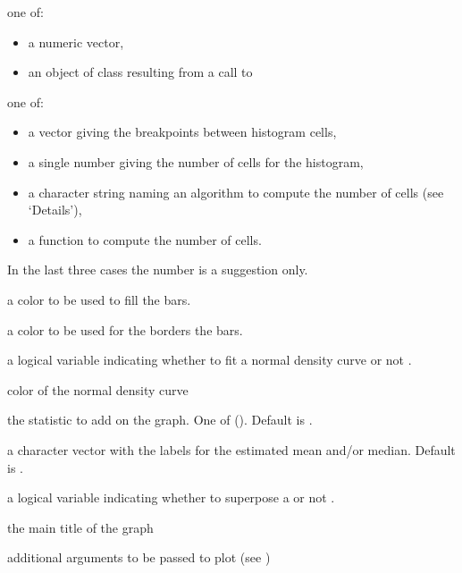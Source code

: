 \documentclass[a4paper]{book}
\begin{document}
%
\begin{Arguments}
\begin{ldescription}
\item[\code{dat}] one of:
\begin{itemize}

\item a numeric vector,
\item an object of class  resulting from a
call to 
\end{itemize}


\item[\code{breaks}] one of:
\begin{itemize}

\item a vector giving the breakpoints between histogram cells,
\item a single number giving the number of cells for the histogram,
\item a character string naming an algorithm to compute the
number of cells (see `Details'),
\item a function to compute the number of cells.

\end{itemize}

In the last three cases the number is a suggestion only.

\item[\code{barc}] a color to be used to fill the bars.
\item[\code{borc}] a color to be used for the borders the bars.
\item[\code{fit.norm}] a logical variable indicating whether to fit a normal density
curve  or not .
\item[\code{lcol}] color of the normal density curve
\item[\code{stat}] the statistic to add on the graph. One of (). Default is .
\item[\code{stat.lab}] a character vector with the labels for the estimated mean and/or median. Default is .
\item[\code{rug}] a logical variable indicating whether to superpose a 
 or not .
\item[\code{main}] the main title of the graph
\item[\code{...}] additional arguments to be passed to plot (see )

\end{ldescription}
\end{Arguments}
\end{document}
